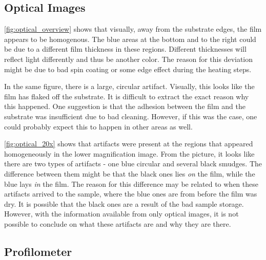 
\subsection{Optical Images}

\noindent \autoref{fig:optical_overview} shows that visually, away from the substrate edges, the film appears to be homogenous.
The blue areas at the bottom and to the right could be due to a different film thickness in these regions.
Different thicknesses will reflect light differently and thus be another color.
The reason for this deviation might be due to bad spin coating or some edge effect during the heating steps.

In the same figure, there is a large, circular artifact.
Visually, this looks like the film has flaked off the substrate.
It is difficult to extract the exact reason why this happened.
One suggestion is that the adhesion between the film and the substrate was insufficient due to bad cleaning.
However, if this was the case, one could probably expect this to happen in other areas as well.

\autoref{fig:optical_20x} shows that artifacts were present at the regions that appeared homogeneously in the lower magnification image.
From the picture, it looks like there are two types of artifacts -  one blue circular and several black smudges.
The difference between them might be that the black ones lies \textit{on} the film, while the blue lays \textit{in} the film.
The reason for this difference may be related to when these artifacts arrived to the sample, where the blue ones are from before the film was dry.
It is possible that the black ones are a result of the bad sample storage.
However, with the information available from only optical images, it is not possible to conclude on what these artifacts are and why they are there.

\subsection{Profilometer}

